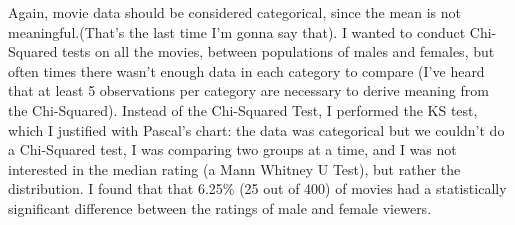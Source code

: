 \documentclass[12pt,twoside]{article}
\begin{document}
\begin{enumerate}
    Again, movie data should be considered categorical, since the mean is not meaningful.(That's the last time I'm gonna say that). I wanted to conduct Chi-Squared tests on all the movies, between populations of males and females, but often times there wasn't enough data in each category to compare (I've heard that at least 5 observations per category are necessary to derive meaning from the Chi-Squared). Instead of the Chi-Squared Test, I performed the KS test, which I justified with Pascal's chart: the data was categorical but we couldn't do a Chi-Squared test, I was comparing two groups at a time, and I was not interested in the median rating (a Mann Whitney U Test), but rather the distribution. I found that that 6.25\% (25 out of 400) of movies had a statistically significant difference between the ratings of male and female viewers.  
    
    \newpage
    

\end{enumerate}
\end{document}
